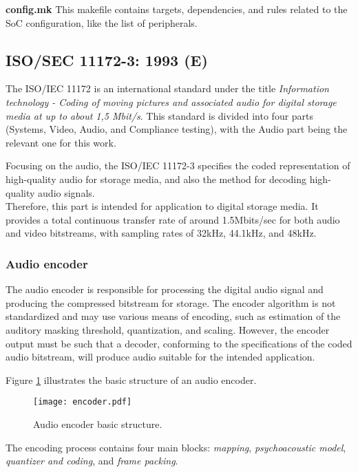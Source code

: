 \textbf{config.mk} This makefile contains targets, dependencies, and rules related to the SoC configuration, like the list of peripherals.

\subsection{ISO/SEC 11172-3: 1993 (E)}

The ISO/IEC 11172 is an international standard under the title \textit{Information technology - Coding of moving pictures and associated audio for digital storage media at up to about 1,5 Mbit/s}. This standard is divided into four parts (Systems, Video, Audio, and Compliance testing), with the Audio part being the relevant one for this work.

Focusing on the audio, the ISO/IEC 11172-3 specifies the coded representation of high-quality audio for storage media, and also the method for decoding high-quality audio signals. \\
Therefore, this part is intended for application to digital storage media. It provides a total continuous transfer rate of around 1.5Mbits/sec for both audio and video bitstreams, with sampling rates of 32kHz, 44.1kHz, and 48kHz.

\subsubsection{Audio encoder}

The audio encoder is responsible for processing the digital audio signal and producing the compressed bitstream for storage. 
The encoder algorithm is not standardized and may use various means of encoding, such as estimation of the auditory masking threshold, quantization, and scaling. However, the encoder output must be such that a decoder, conforming to the specifications of the coded audio bitstream, will produce audio suitable for the intended application.

Figure \ref{fig:encoder} illustrates the basic structure of an audio encoder. 

\begin{figure}[H]
\centerline{\texttt{[image: encoder.pdf]}}
\caption{Audio encoder basic structure.}
\label{fig:encoder}
\end{figure}

The encoding process contains four main blocks: \textit{mapping}, \textit{psychoacoustic model}, \textit{quantizer and coding}, and \textit{frame packing}.

